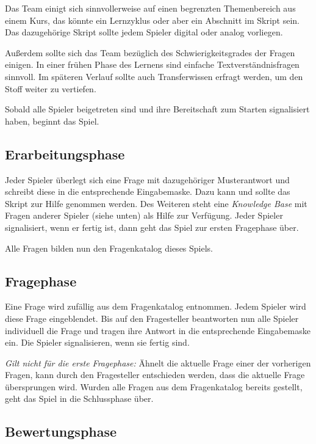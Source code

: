 \documentclass[a4paper,11pt,listof=numbered,glossary=totoc,parskip=half]{scrreprt}
\begin{document}
Das Team einigt sich sinnvollerweise auf einen begrenzten Themenbereich aus einem Kurs, das könnte ein Lernzyklus oder aber ein Abschnitt im Skript sein. Das dazugehörige Skript sollte jedem Spieler digital oder analog vorliegen.

Außerdem sollte sich das Team bezüglich des Schwierigkeitsgrades der Fragen einigen. In einer frühen Phase des Lernens sind einfache Textverständnisfragen sinnvoll. Im späteren Verlauf sollte auch Transferwissen erfragt werden, um den Stoff weiter zu vertiefen.

Sobald alle Spieler beigetreten sind und ihre Bereitschaft zum Starten signalisiert haben, beginnt das Spiel. 



\subsection{Erarbeitungsphase}

Jeder Spieler überlegt sich eine Frage mit dazugehöriger \frqq{}Musterantwort\flqq{} und schreibt diese in die entsprechende Eingabemaske. Dazu kann und sollte das Skript zur Hilfe genommen werden. Des Weiteren steht eine \textit{Knowledge Base} mit Fragen anderer Spieler (siehe unten) als Hilfe zur Verfügung. Jeder Spieler signalisiert, wenn er fertig ist, dann geht das Spiel zur ersten Fragephase über.

Alle Fragen bilden nun den Fragenkatalog dieses Spiels.

\subsection{Fragephase}

Eine Frage wird zufällig aus dem Fragenkatalog entnommen. Jedem Spieler wird diese Frage eingeblendet. Bis auf den Fragesteller beantworten nun alle Spieler individuell die Frage und tragen ihre Antwort in die entsprechende Eingabemaske ein. Die Spieler signalisieren, wenn sie fertig sind.

\textit{Gilt nicht für die erste Fragephase:}
Ähnelt die aktuelle Frage einer der vorherigen Fragen, kann durch den Fragesteller entschieden werden, dass die aktuelle Frage übersprungen wird.
Wurden alle Fragen aus dem Fragenkatalog bereits gestellt, geht das Spiel in die Schlussphase über.

\subsection{Bewertungsphase}
\end{document}
